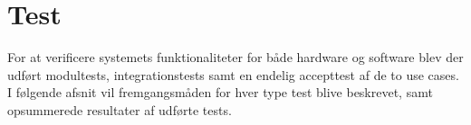 \chapter{Test}
For at verificere systemets funktionaliteter for både hardware og software blev der udført modultests, integrationstests samt en endelig accepttest af de to use cases. I følgende afsnit vil fremgangsmåden for hver type test blive beskrevet, samt opsummerede resultater af udførte tests. 